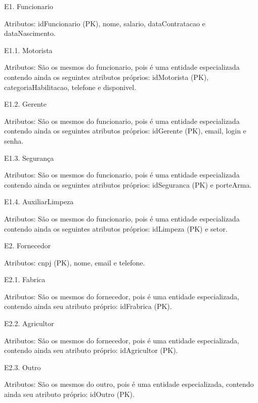 \documentclass[12pt, onecolumn, titlepage]{article}
\begin{document}
\begin{description}

\item E1. Funcionario
\item \qquad Atributos: idFuncionario (PK), nome, salario, dataContratacao e dataNascimento.

\item E1.1. Motorista
\item \qquad Atributos: São os mesmos do funcionario, pois é uma entidade especializada contendo ainda os seguintes atributos próprios: idMotorista (PK), categoriaHabilitacao, telefone e disponivel.

\item E1.2. Gerente
\item \qquad Atributos: São os mesmos do funcionario, pois é uma entidade especializada contendo ainda os seguintes atributos próprios: idGerente (PK), email, login e senha.

\item E1.3. Segurança
\item \qquad Atributos: São os mesmos do funcionario, pois é uma entidade especializada contendo ainda os seguintes atributos próprios: idSeguranca (PK) e porteArma.

\item E1.4. AuxiliarLimpeza
\item \qquad Atributos: São os mesmos do funcionario, pois é uma entidade especializada contendo ainda os seguintes atributos próprios: idLimpeza (PK) e setor.

\item E2. Fornecedor
\item \qquad Atributos: cnpj (PK), nome, email e telefone.

\item E2.1. Fabrica
\item \qquad Atributos: São os mesmos do fornecedor, pois é uma entidade especializada, contendo ainda seu atributo próprio: idFrabrica (PK).

\item E2.2. Agricultor
\item \qquad Atributos: São os mesmos do fornecedor, pois é uma entidade especializada, contendo ainda seu atributo próprio: idAgricultor (PK).

\item E2.3. Outro
\item \qquad Atributos: São os mesmos do outro, pois é uma entidade especializada, contendo ainda seu atributo próprio: idOutro (PK).


\end{description}
\end{document}
